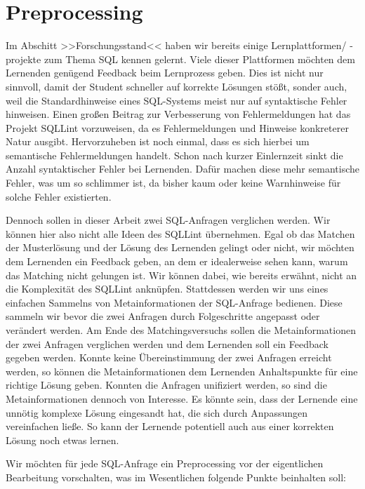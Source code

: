 \section{Preprocessing}

Im Abschitt >>Forschungsstand<< haben wir bereits einige Lernplattformen/ -projekte zum Thema SQL kennen gelernt. Viele dieser Plattformen möchten dem Lernenden genügend Feedback beim Lernprozess geben. Dies ist nicht nur sinnvoll, damit der Student schneller auf korrekte Lösungen stößt, sonder auch, weil die Standardhinweise eines SQL-Systems meist nur auf syntaktische Fehler hinweisen. Einen großen Beitrag zur Verbesserung von Fehlermeldungen hat das Projekt SQLLint vorzuweisen, da es Fehlermeldungen und Hinweise konkreterer Natur ausgibt. Hervorzuheben ist noch einmal, dass es sich hierbei um semantische Fehlermeldungen handelt. Schon nach kurzer Einlernzeit sinkt die Anzahl syntaktischer Fehler bei Lernenden. Dafür machen diese mehr semantische Fehler, was um so schlimmer ist, da bisher kaum oder keine Warnhinweise für solche Fehler existierten. 

Dennoch sollen in dieser Arbeit zwei SQL-Anfragen verglichen werden. Wir können hier also nicht alle Ideen des SQLLint übernehmen. Egal ob das Matchen der Musterlösung und der Lösung des Lernenden gelingt oder nicht, wir möchten dem Lernenden ein Feedback geben, an dem er idealerweise sehen kann, warum das Matching nicht gelungen ist. Wir können dabei, wie bereits erwähnt, nicht an die Komplexität des SQLLint anknüpfen. Stattdessen werden wir uns eines einfachen Sammelns von Metainformationen der SQL-Anfrage bedienen. Diese sammeln wir bevor die zwei Anfragen durch Folgeschritte angepasst oder verändert werden. Am Ende des Matchingsversuchs sollen die Metainformationen der zwei Anfragen verglichen werden und dem Lernenden soll ein Feedback gegeben werden. Konnte keine Übereinstimmung der zwei Anfragen erreicht werden, so können die Metainformationen dem Lernenden Anhaltspunkte für eine richtige Lösung geben. Konnten die Anfragen unifiziert werden, so sind die Metainformationen dennoch von Interesse. Es könnte sein, dass der Lernende eine unnötig komplexe Lösung eingesandt hat, die sich durch Anpassungen vereinfachen ließe. So kann der Lernende potentiell auch aus einer korrekten Lösung noch etwas lernen.

Wir möchten für jede SQL-Anfrage ein Preprocessing vor der eigentlichen Bearbeitung vorschalten, was im Wesentlichen folgende Punkte beinhalten soll:

